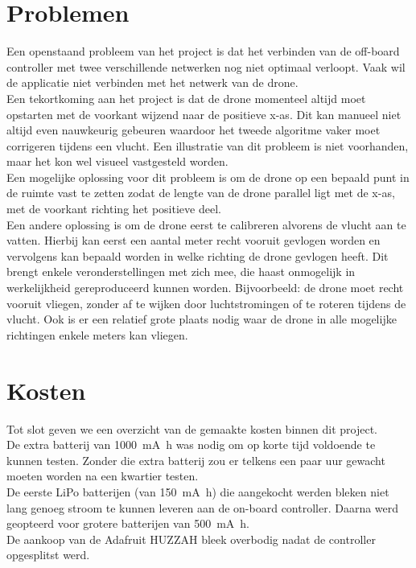 \section{Problemen} \label{sec:problems}
Een openstaand probleem van het project is dat het verbinden van de off-board controller met twee verschillende netwerken nog niet optimaal verloopt. Vaak wil de applicatie niet verbinden met het netwerk van de drone.\\

Een tekortkoming aan het project is dat de drone momenteel altijd moet opstarten met de voorkant wijzend naar de positieve x-as.
Dit kan manueel niet altijd even nauwkeurig gebeuren waardoor het tweede algoritme vaker moet corrigeren tijdens een vlucht.
Een illustratie van dit probleem is niet voorhanden, maar het kon wel visueel vastgesteld worden.\\

Een mogelijke oplossing voor dit probleem is om de drone op een bepaald punt in de ruimte vast te zetten zodat de lengte van de drone parallel ligt met de x-as, met de voorkant richting het positieve deel.\\
Een andere oplossing is om de drone eerst te calibreren alvorens de vlucht aan te vatten.
Hierbij kan eerst een aantal meter recht vooruit gevlogen worden en vervolgens kan bepaald worden in welke richting de drone gevlogen heeft.
Dit brengt enkele veronderstellingen met zich mee, die haast onmogelijk in werkelijkheid gereproduceerd kunnen worden.
Bijvoorbeeld: de drone moet recht vooruit vliegen, zonder af te wijken door luchtstromingen of te roteren tijdens de vlucht.
Ook is er een relatief grote plaats nodig waar de drone in alle mogelijke richtingen enkele meters kan vliegen.\\

\section{Kosten}
Tot slot geven we een overzicht van de gemaakte kosten binnen dit project.\\
De extra batterij van \SI{1000}{\mA\hour} was nodig om op korte tijd voldoende te kunnen testen.
Zonder die extra batterij zou er telkens een paar uur gewacht moeten worden na een kwartier testen.\\
De eerste LiPo batterijen (van \SI{150}{\mA\hour}) die aangekocht werden bleken niet lang genoeg stroom te kunnen leveren aan de on-board controller. Daarna werd geopteerd voor grotere batterijen van \SI{500}{\mA\hour}.\\
De aankoop van de Adafruit HUZZAH bleek overbodig nadat de controller opgesplitst werd.\\

